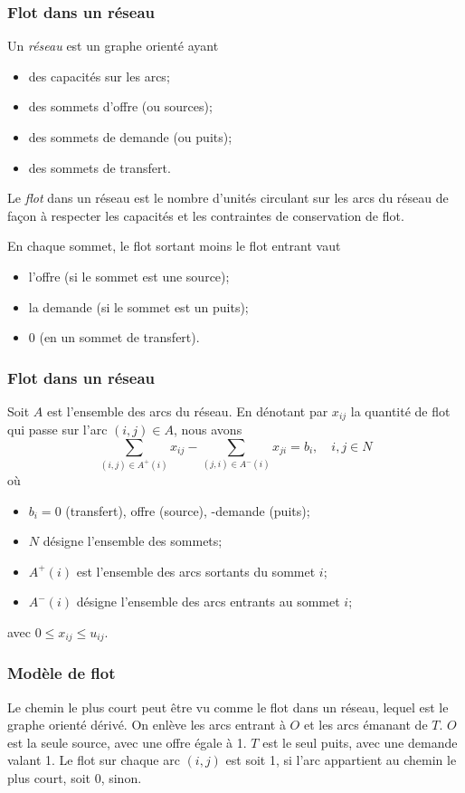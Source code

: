 \documentclass[usepdftitle=false, aspectratio=169]{beamer}
\begin{document}
\begin{frame}
\frametitle{Flot dans un réseau}

Un {\sl réseau} est un graphe orienté ayant
\begin{itemize}
	\item 
	des capacités sur les arcs;
	\item
	des sommets d'offre (ou sources);
	\item
	des sommets de demande (ou puits);
	\item
	des sommets de transfert.
\end{itemize}

\mbox{}

Le {\sl flot} dans un réseau est le nombre d'unités circulant sur les arcs du réseau de façon à respecter les capacités et les contraintes de conservation de flot.

\mbox{}

En chaque sommet, le flot sortant moins le flot entrant vaut
\begin{itemize}
	\item 
	l'offre (si le sommet est une source);
	\item
	la demande (si le sommet est un puits);
	\item
	0 (en un sommet de transfert).
\end{itemize}

\end{frame}

\begin{frame}
\frametitle{Flot dans un réseau}

Soit $A$ est l'ensemble des arcs du réseau.
En dénotant par $x_{ij}$ la quantité de flot qui passe sur l'arc $(i,j) \in A$, nous avons
\[
\sum_{(i,j) \in A^+(i)} x_{ij} - \sum_{(j,i) \in A^-(i) }x_{ji} = b_i,\quad i, j \in N
\]
où
\begin{itemize}
	\item 
	$b_i = 0$ (transfert), offre (source), -demande (puits);
	\item
	$N$ désigne l'ensemble des sommets;
	\item
	$A^+(i)$ est l'ensemble des arcs sortants du sommet $i$;
	\item
	$A^-(i)$ désigne l'ensemble des arcs entrants au sommet $i$;
\end{itemize}
avec $0 \leq x_{ij} \leq u_{ij}$.

\end{frame}

\begin{frame}
\frametitle{Modèle de flot}

Le chemin le plus court peut être vu comme le flot dans un réseau, lequel est le graphe orienté dérivé.
On enlève les arcs entrant à $O$ et les arcs émanant de $T$.
$O$ est la seule source, avec une offre égale à 1.
$T$ est le seul puits, avec une demande valant 1.
Le flot sur chaque arc $(i,j)$ est soit 1, si l'arc appartient au chemin le plus court, soit 0, sinon.

\end{frame}
\end{document}
